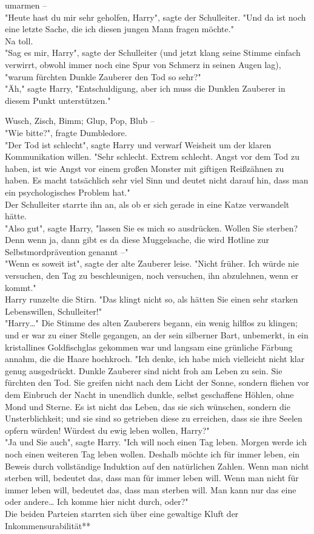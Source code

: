 {umarmen --\\ "Heute hast du mir sehr geholfen, Harry", sagte der Schulleiter. "Und da ist noch eine letzte Sache, die ich diesen jungen Mann fragen möchte."\\ Na toll.\\ "Sag es mir, Harry", sagte der Schulleiter (und jetzt klang seine Stimme einfach verwirrt, obwohl immer noch eine Spur von Schmerz in seinen Augen lag), "warum fürchten Dunkle Zauberer den Tod so sehr?"\\ "Äh," sagte Harry, "Entschuldigung, aber ich muss die Dunklen Zauberer in diesem Punkt unterstützen."

Wusch, Zisch, Bimm; Glup, Pop, Blub --\\ "Wie bitte?", fragte Dumbledore.\\ "Der Tod ist schlecht", sagte Harry und verwarf Weisheit um der klaren Kommunikation willen. "Sehr schlecht. Extrem schlecht. Angst vor dem Tod zu haben, ist wie Angst vor einem großen Monster mit giftigen Reißzähnen zu haben. Es macht tatsächlich sehr viel Sinn und deutet nicht darauf hin, dass man ein psychologisches Problem hat."\\ Der Schulleiter starrte ihn an, als ob er sich gerade in eine Katze verwandelt hätte.\\ "Also gut", sagte Harry, "lassen Sie es mich so ausdrücken. Wollen Sie sterben? Denn wenn ja, dann gibt es da diese Muggelsache, die wird Hotline zur Selbstmordprävention genannt --"\\ "Wenn es soweit ist", sagte der alte Zauberer leise. "Nicht früher. Ich würde nie versuchen, den Tag zu beschleunigen, noch versuchen, ihn abzulehnen, wenn er kommt."\\ Harry runzelte die Stirn. "Das klingt nicht so, als hätten Sie einen sehr starken Lebenswillen, Schulleiter!"\\ "Harry…" Die Stimme des alten Zauberers begann, ein wenig hilflos zu klingen; und er war zu einer Stelle gegangen, an der sein silberner Bart, unbemerkt, in ein kristallines Goldfischglas gekommen war und langsam eine grünliche Färbung annahm, die die Haare hochkroch. "Ich denke, ich habe mich vielleicht nicht klar genug ausgedrückt. Dunkle Zauberer sind nicht froh am Leben zu sein. Sie fürchten den Tod. Sie greifen nicht nach dem Licht der Sonne, sondern fliehen vor dem Einbruch der Nacht in unendlich dunkle, selbst geschaffene Höhlen, ohne Mond und Sterne. Es ist nicht das Leben, das sie sich wünschen, sondern die Unsterblichkeit; und sie sind so getrieben diese zu erreichen, dass sie ihre Seelen opfern würden! Würdest du ewig leben wollen, Harry?"\\ "Ja und Sie auch", sagte Harry. "Ich will noch einen Tag leben. Morgen werde ich noch einen weiteren Tag leben wollen. Deshalb möchte ich für immer leben, ein Beweis durch vollständige Induktion auf den natürlichen Zahlen. Wenn man nicht sterben will, bedeutet das, dass man für immer leben will. Wenn man nicht für immer leben will, bedeutet das, dass man sterben will. Man kann nur das eine oder andere… Ich komme hier nicht durch, oder?"\\ Die beiden Parteien starrten sich über eine gewaltige Kluft der Inkommensurabilität** }
